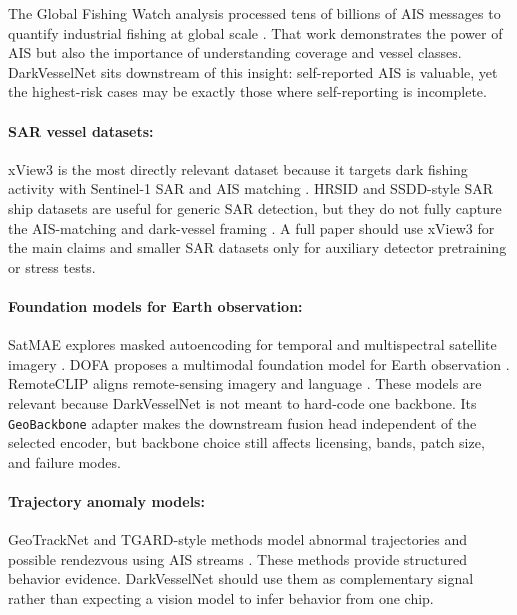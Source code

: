 \documentclass{article}
\begin{document}
The Global Fishing Watch analysis processed tens of billions of AIS messages to quantify industrial fishing at global scale \citep{kroodsma2018tracking}. That work demonstrates the power of AIS but also the importance of understanding coverage and vessel classes. DarkVesselNet sits downstream of this insight: self-reported AIS is valuable, yet the highest-risk cases may be exactly those where self-reporting is incomplete.

\paragraph{SAR vessel datasets:}

xView3 is the most directly relevant dataset because it targets dark fishing activity with Sentinel-1 SAR and AIS matching \citep{paolo2022xview3}. HRSID and SSDD-style SAR ship datasets are useful for generic SAR detection, but they do not fully capture the AIS-matching and dark-vessel framing \citep{wei2020hrsid}. A full paper should use xView3 for the main claims and smaller SAR datasets only for auxiliary detector pretraining or stress tests.

\paragraph{Foundation models for Earth observation:}

SatMAE explores masked autoencoding for temporal and multispectral satellite imagery \citep{cong2022satmae}. DOFA proposes a multimodal foundation model for Earth observation \citep{xiong2024dofa}. RemoteCLIP aligns remote-sensing imagery and language \citep{liu2024remoteclip}. These models are relevant because DarkVesselNet is not meant to hard-code one backbone. Its \texttt{GeoBackbone} adapter makes the downstream fusion head independent of the selected encoder, but backbone choice still affects licensing, bands, patch size, and failure modes.

\paragraph{Trajectory anomaly models:}

GeoTrackNet and TGARD-style methods model abnormal trajectories and possible rendezvous using AIS streams \citep{nguyen2020geotracknet,sharma2022tist}. These methods provide structured behavior evidence. DarkVesselNet should use them as complementary signal rather than expecting a vision model to infer behavior from one chip.
\end{document}
